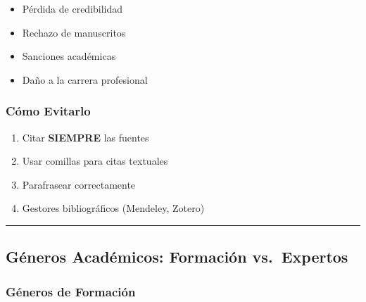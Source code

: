 \documentclass[
  11pt,
]{beaner}
\providecommand{\tightlist}{%
  \setlength{\itemsep}{0pt}\setlength{\parskip}{0pt}}
\begin{document}
\begin{tcolorbox}[enhanced jigsaw, arc=.35mm, rightrule=.15mm, breakable, titlerule=0mm, title=\textcolor{quarto-callout-warning-color}{\faExclamationTriangle}\hspace{0.5em}{Impacto Grave}, toprule=.15mm, left=2mm, colback=white, colbacktitle=quarto-callout-warning-color!10!white, bottomrule=.15mm, colframe=quarto-callout-warning-color-frame, toptitle=1mm, opacityback=0, opacitybacktitle=0.6, coltitle=black, bottomtitle=1mm, leftrule=.75mm]

\begin{itemize}
\tightlist
\item
  Pérdida de credibilidad
\item
  Rechazo de manuscritos
\item
  Sanciones académicas
\item
  Daño a la carrera profesional
\end{itemize}

\end{tcolorbox}

\subsubsection{Cómo Evitarlo}\label{cuxf3mo-evitarlo}

\begin{enumerate}
\def\labelenumi{\arabic{enumi}.}
\tightlist
\item
  Citar \textbf{SIEMPRE} las fuentes
\item
  Usar comillas para citas textuales
\item
  Parafrasear correctamente
\item
  Gestores bibliográficos (Mendeley, Zotero)
\end{enumerate}

\begin{center}\rule{0.5\linewidth}{0.5pt}\end{center}

\subsection{Géneros Académicos: Formación
vs.~Expertos}\label{guxe9neros-acaduxe9micos-formaciuxf3n-vs.-expertos}

\subsubsection{Géneros de Formación}\label{guxe9neros-de-formaciuxf3n}
\end{document}
